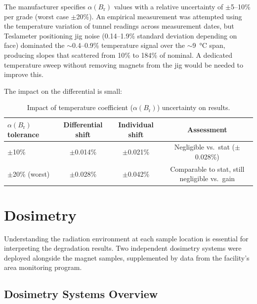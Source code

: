 \documentclass[11pt,letterpaper]{article}
\newcommand{\Br}{B_\mathrm{r}}
\newcommand{\alphar}{\alpha(\Br)}
\begin{document}
The manufacturer specifies $\alphar$ values with a relative uncertainty of
$\pm$5--10\% per grade (worst case $\pm$20\%). An empirical measurement was
attempted using the temperature variation of tunnel readings across
measurement dates, but Teslameter positioning jig noise
(0.14--1.9\% standard deviation depending on face) dominated the
$\sim$0.4--0.9\% temperature signal over the $\sim$\SI{9}{\celsius} span,
producing slopes that scattered from 10\% to 184\% of nominal. A dedicated
temperature sweep without removing magnets from the jig would be needed to
improve this.

The impact on the differential is small:

\begin{table}[H]
\centering
\caption{Impact of temperature coefficient ($\alphar$) uncertainty on results.}
\label{tab:alpha_uncertainty}
\begin{tabular}{@{}lccc@{}}
\toprule
$\alphar$ tolerance & Differential shift & Individual shift & Assessment \\
\midrule
$\pm$10\% & $\pm$0.014\% & $\pm$0.021\% & Negligible vs.\ stat ($\pm$0.028\%) \\
$\pm$20\% (worst) & $\pm$0.028\% & $\pm$0.042\% & Comparable to stat, still negligible vs.\ gain \\
\bottomrule
\end{tabular}
\end{table}

\section{Dosimetry}
\label{sec:dosimetry}

Understanding the radiation environment at each sample location is essential
for interpreting the degradation results. Two independent dosimetry systems
were deployed alongside the magnet samples, supplemented by data from the
facility's area monitoring program.

\subsection{Dosimetry Systems Overview}
\end{document}
